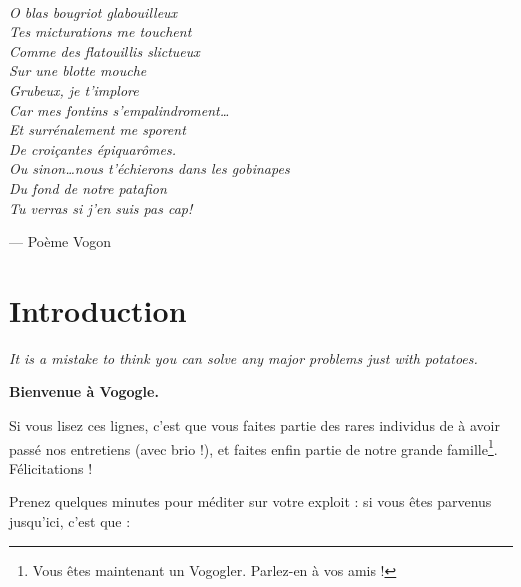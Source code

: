 \newpage ~

\vspace{5cm}

\noindent\emph{O blas bougriot glabouilleux\\
Tes micturations me touchent\\
Comme des flatouillis slictueux\\
Sur une blotte mouche\\
Grubeux, je t'implore\\
Car mes fontins s'empalindroment\ldots\\
Et surrénalement me sporent\\
De croiçantes épiquarômes.\\
Ou sinon\ldots nous t'échierons dans les gobinapes\\
Du fond de notre patafion\\
Tu verras si j'en suis pas cap!
}

\vspace{1cm}

\hspace{5cm} --- Poème Vogon

\newpage

\section{Introduction}

\emph{It is a mistake to think you can solve any major problems just with
potatoes.}


\vspace{1cm}

\textbf{Bienvenue à Vogogle.}

Si vous lisez ces lignes, c'est que vous faites partie des rares individus de à
avoir passé nos entretiens (avec brio !), et faites enfin partie de notre
grande famille\footnote{Vous êtes maintenant un Vogogler. Parlez-en à vos
amis !}. Félicitations !

Prenez quelques minutes pour méditer sur votre exploit : si vous êtes parvenus
jusqu'ici, c'est que :

